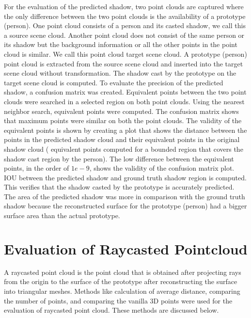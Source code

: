 For the evaluation of the predicted shadow, two point clouds are captured where the only difference between the two point clouds is the availability of a prototype (person). One point cloud consists of a person and its casted shadow, we call this a source scene cloud. Another point cloud does not consist of the same person or its shadow but the background information or all the other points in the point cloud is similar. We call this point cloud target scene cloud. A prototype (person) point cloud is extracted from the source scene cloud and inserted into the target scene cloud without transformation. The shadow cast by the prototype on the target scene cloud is computed. To evaluate the precision of the predicted shadow, a confusion matrix was created. Equivalent points between the two point clouds were searched in a selected region on both point clouds. Using the nearest neighbor search, equivalent points were computed. The confusion matrix shows that maximum points were similar on both the point clouds. The validity of the equivalent points is shown by creating a plot that shows the distance between the points in the predicted shadow cloud and their equivalent points in the original shadow cloud ( equivalent points computed for a bounded region that covers the shadow cast region by the person). The low difference between the equivalent points, in the order of \(1e-9\), shows the validity of the confusion matrix plot. IOU between the predicted shadow and ground truth shadow region is computed. This verifies that the shadow casted by the prototype is accurately predicted. The area of the predicted shadow was more in comparison with the ground truth shadow because the reconstructed surface for the prototype (person) had a bigger surface area than the actual prototype.

\section{Evaluation of Raycasted Pointcloud}
A raycasted point cloud is the point cloud that is obtained after projecting rays from the origin to the surface of the prototype after reconstructing the surface into triangular meshes. Methods like calculation of average distance, comparing the number of points, and comparing the vanilla 3D points were used for the evaluation of raycasted point cloud. These methods are discussed below.
